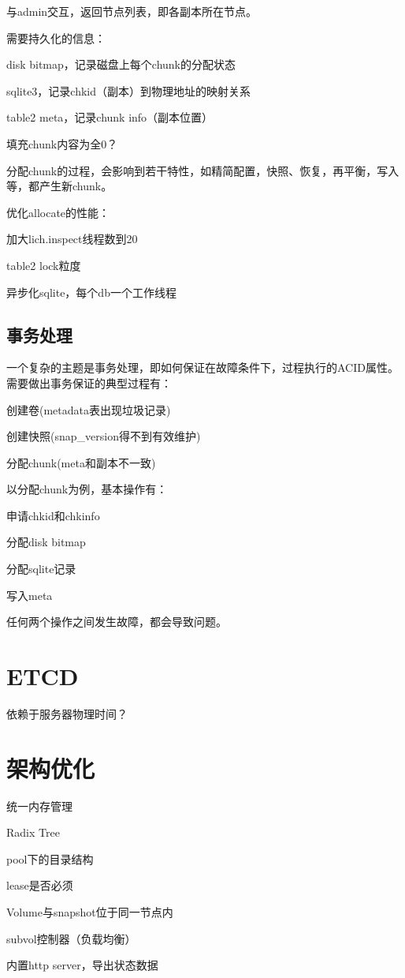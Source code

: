 与admin交互，返回节点列表，即各副本所在节点。

需要持久化的信息：
\begin{compactitem}
\item disk bitmap，记录磁盘上每个chunk的分配状态
\item sqlite3，记录chkid（副本）到物理地址的映射关系
\item table2 meta，记录chunk info（副本位置）
\item 填充chunk内容为全0？
\end{compactitem}

分配chunk的过程，会影响到若干特性，如精简配置，快照、恢复，再平衡，写入等，都产生新chunk。

优化allocate的性能：
\begin{compactitem}
\item 加大lich.inspect线程数到20
\item table2 lock粒度 
\item 异步化sqlite，每个db一个工作线程
\end{compactitem}

\subsection{事务处理}

一个复杂的主题是事务处理，即如何保证在故障条件下，过程执行的ACID属性。
需要做出事务保证的典型过程有：
\begin{compactenum}
\item 创建卷(metadata表出现垃圾记录)
\item 创建快照(snap\_version得不到有效维护)
\item 分配chunk(meta和副本不一致)
\end{compactenum}

以分配chunk为例，基本操作有：
\begin{compactenum}
\item 申请chkid和chkinfo
\item 分配disk bitmap
\item 分配sqlite记录
\item 写入meta
\end{compactenum}

任何两个操作之间发生故障，都会导致问题。

\section{ETCD}

依赖于服务器物理时间？

\section{架构优化}

\begin{enumbox}
\item 统一内存管理
\item Radix Tree
\item pool下的目录结构
\item lease是否必须
\item Volume与snapshot位于同一节点内
\item subvol控制器（负载均衡）
\item 内置http server，导出状态数据
\end{enumbox}
